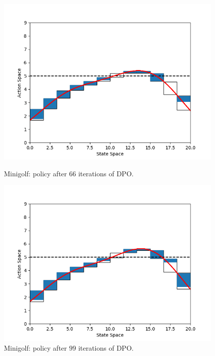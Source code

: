 \begin{figure}[h!]
	\centering
	\begin{minipage}[t]{.48\columnwidth}
		\includegraphics[width=\textwidth]{plots/it66.png}
		\caption{Minigolf: policy after $66$ iterations of DPO.}
		\label{fig:mg66}
	\end{minipage}%
	\hfill
	\begin{minipage}[t]{.48\columnwidth}
		\includegraphics[width=\textwidth]{plots/it99.png}
		\caption{Minigolf: policy after $99$ iterations of DPO.}
		\label{fig:mg99}
	\end{minipage}
\end{figure}
